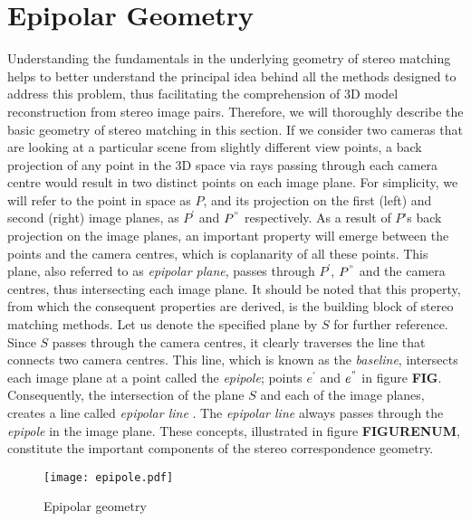 \documentclass[12pt]{report}
\begin{document}
\section{Epipolar Geometry}
Understanding the fundamentals in the underlying geometry of stereo matching helps to better understand the principal idea behind all the methods designed to address this problem, 
thus facilitating the comprehension of 3D model reconstruction from stereo image pairs. Therefore, we will thoroughly describe the basic geometry of stereo matching in this section. \newline
If we consider two cameras that are looking at a particular scene from slightly different view points, a back projection of any point in the 3D space via rays passing through each camera centre
would result in two distinct points on each image plane. For simplicity, we will refer to the point in space as $P$, and its projection on the first (left) and second (right) image planes,
as $P^{'}$ and ${P}^{"}$ respectively. \newline
As a result of $P$'s back projection on the image planes, an important property will emerge between the points and the camera centres, which is coplanarity of all these points. 
This plane, also referred to as {\it epipolar plane}, passes through $P^{'}$, $P^{"}$ and the camera centres, thus intersecting each image plane. 
It should be noted that this property, from which the consequent properties are derived, is the building block of stereo matching methods. 
Let us denote the specified plane by $S$ for further reference. 
Since $S$ passes through the camera centres, it clearly traverses the line 
that connects two camera centres. This line, which is known as the {\it baseline}, intersects each image plane at a point called the {\it epipole}; points ${e}^{'}$ and ${e}^{"}$
in figure \textbf{FIG}. 
Consequently, the intersection of the plane $S$ and each of the image planes, creates a line called {\it epipolar line} \cite{hart2000}. 
The {\it epipolar line} always passes through the {\it epipole} in the image plane. 
These concepts, illustrated in figure \textbf{FIGURENUM}, constitute the important components of the stereo correspondence geometry. \newline 

\begin{figure}[h!]
\centering
\texttt{[image: epipole.pdf]}
\caption{Epipolar geometry}
\end{figure} 
\end{document}
